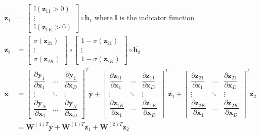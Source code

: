 \documentclass[12pt]{article}
\newcommand{\m}[1]{\mathbf{#1}}
\newcommand{\ol}[1]{\overline{#1}}
\begin{document}
\begin{align*}
    \ol{\m z_1} &= \begin{bmatrix} \mathbb{I}(\m z_{11} > 0) \\ \vdots \\ \mathbb{I}(\m z_{1K} > 0) \end{bmatrix} \circ \ol{\m h_1} \text{ where }\mathbb{I}\text{ is the indicator function}\\
    \ol{\m z_2} &= \begin{bmatrix} \sigma(\m z_{21}) \\ \vdots \\ \sigma(\m z_{2K}) \end{bmatrix} \circ \begin{bmatrix} 1 - \sigma(\m z_{21}) \\ \vdots \\ 1 - \sigma(\m z_{2K}) \end{bmatrix} \circ \ol{\m h_2}\\
    \ol{\m x} &= \begin{bmatrix} \dfrac{\partial\m y_1}{\partial\m x_1} & \dots & \dfrac{\partial\m y_1}{\partial\m x_D} \\ \vdots & \ddots & \vdots \\ \dfrac{\partial\m y_N}{\partial\m x_1} & \dots & \dfrac{\partial\m y_N}{\partial\m x_D} \end{bmatrix}^T \ol{\m y} + \begin{bmatrix} \dfrac{\partial\m z_{11}}{\partial\m x_1} & \dots & \dfrac{\partial\m z_{11}}{\partial\m x_D} \\ \vdots & \ddots & \vdots \\ \dfrac{\partial\m z_{1K}}{\partial\m x_1} & \dots & \dfrac{\partial\m z_{1K}}{\partial\m x_D} \end{bmatrix}^T \ol{\m z_1} + \begin{bmatrix} \dfrac{\partial\m z_{21}}{\partial\m x_1} & \dots & \dfrac{\partial\m z_{21}}{\partial\m x_D} \\ \vdots & \ddots & \vdots \\ \dfrac{\partial\m z_{2K}}{\partial\m x_1} & \dots & \dfrac{\partial\m z_{2K}}{\partial\m x_D} \end{bmatrix}^T \ol{\m z_2} \\
    &= \m W^{(4)T} \ol{\m y} + \m W^{(1)T} \ol{\m z_1} + \m W^{(2)T} \ol{\m z_2}
\end{align*}
\end{document}
